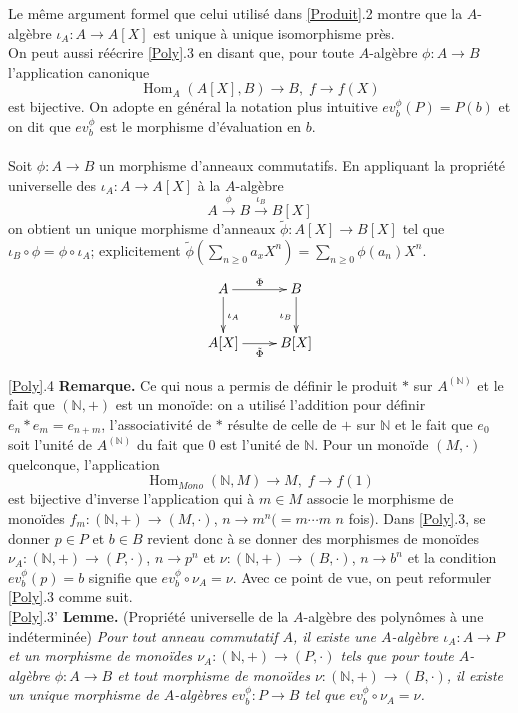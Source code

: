\documentclass[a4paper, oneside, 12pt]{book}
\theoremstyle{theoremeStyle} %
\theoremstyle{definition} %
\DeclareMathOperator{\SHom}{Hom}
\newcommand{\N}{\mathbb{N}}
\begin{document}
  Le même argument  formel que celui utilisé dans \ref{Produit}.2 montre que la $A$-algèbre $\iota_A:A\rightarrow A[X]$ est unique à unique isomorphisme  près.\\

  On peut aussi réécrire \ref{Poly}.3 en disant que, pour toute $A$-algèbre $\phi:A\rightarrow B$  l'application canonique
$$\SHom_A(A[X],B)\rightarrow B,\; f\rightarrow f(X)$$
 est bijective. On adopte  en général la notation plus intuitive $ev_{b}^\phi(P)=P( b)$ et on dit que $ev_{b}^\phi$ est le morphisme d'évaluation en $b$.\\
\\
 Soit $\phi:A  \rightarrow B $ un morphisme  d'anneaux commutatifs. En appliquant la propriété universelle des $\iota_A:A\rightarrow A[X]$  à la $A$-algèbre
$$A\stackrel{\phi}{\rightarrow} B\stackrel{\iota_B}{\rightarrow}B[X]$$
on obtient un unique morphisme d'anneaux  $\tilde{\phi}:A[X]\rightarrow B[X]$ tel que $\iota_B\circ \phi=\phi\circ \iota_A$; explicitement $\tilde{\phi}(\sum_{n\geq 0}a_xX^n)=\sum_{n\geq 0}\phi(a_n)X^n$.\\

	$$ \xymatrix{ A\ar[r]^\Phi \ar[d]^{\iota_A} & B \ar[d]_{\iota_B} \\ A[X]\ar[r]_{\tilde{\Phi}} & B[X] } $$


   \ref{Poly}.4 \textbf{Remarque.} Ce qui nous a permis de définir le produit $*$ sur $A^{(\N)}$ et le fait que $(\N,+)$ est un monoïde: on a utilisé l'addition pour définir $e_n*e_m=e_{n+m}$, l'associativité de $*$ résulte de celle de $+$ sur $\N$ et le fait que $e_0$ soit l'unité de $A^{(\N)}$ du fait que $0$ est l'unité de $\N$.  Pour un monoïde $(M,\cdot)$ quelconque, l'application
 $$\SHom_{Mono}(\N,M)\rightarrow M,\; f\rightarrow f(1)$$
 est bijective d'inverse l'application qui à $m\in M$ associe le morphisme de monoïdes $f_m:(\N,+)\rightarrow (M,\cdot)$, $n\rightarrow m^n(=m\cdots m$ $n$ fois). Dans \ref{Poly}.3, se donner $p\in P$ et $b\in B$ revient donc à se donner des morphismes de monoïdes $\nu_A:(\N,+)\rightarrow (P,\cdot)$, $n\rightarrow p^n$ et $\nu:(\N,+)\rightarrow (B,\cdot)$, $n\rightarrow b^n$ et la condition $ev^\phi_b(p)=b$ signifie que $ev^\phi_b\circ \nu_A=\nu$. Avec ce point de vue, on peut reformuler \ref{Poly}.3 comme suit. \\

  \ref{Poly}.3' \textbf{Lemme.} (Propriété universelle de la $A$-algèbre des polynômes à une indéterminée) \textit{Pour tout anneau commutatif $A$, il existe une $A$-algèbre $\iota_A: A\rightarrow P$ et un morphisme de monoïdes $\nu_A:(\N,+)\rightarrow (P,\cdot)$ tels que pour toute $A$-algèbre $\phi: A\rightarrow B$ et tout morphisme de monoïdes $\nu:(\N,+)\rightarrow (B,\cdot)$, il existe un unique  morphisme de $A$-algèbres $ev^\phi_b:P\rightarrow B$  tel que $ ev^\phi_b\circ \nu_A=\nu$. }\\
\end{document}

